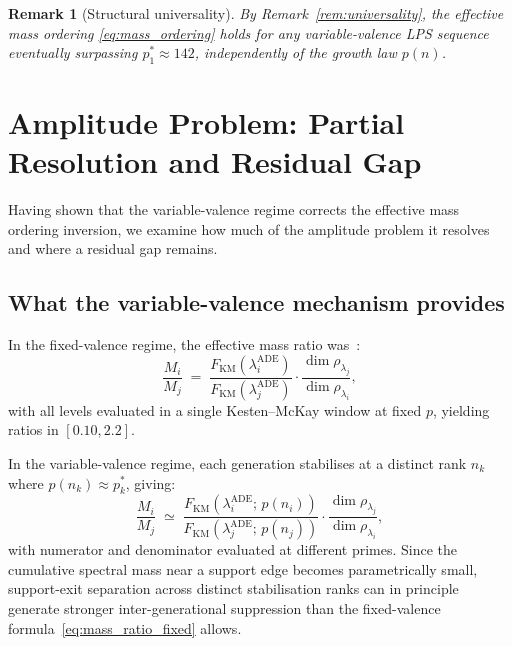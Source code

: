 \documentclass[11pt]{article}
\newtheorem{remark}[theorem]{Remark}
\newcommand{\lADE}[1]{\lambda_{#1}^{\mathrm{ADE}}}
\newcommand{\FKM}{F_{\mathrm{KM}}}
\begin{document}
    \begin{remark}[Structural universality]
      \label{rem:universality_mass}
      By Remark~\ref{rem:universality}, the effective mass ordering
      \eqref{eq:mass_ordering} holds for any variable-valence LPS sequence
      eventually surpassing $p_1^* \approx 142$, independently of the growth
      law $p(n)$.
    \end{remark}

  \section{Amplitude Problem: Partial Resolution and Residual Gap}
  \label{sec:amplitude}


  Having shown that the variable-valence regime corrects the effective mass
  ordering inversion, we examine how much of the amplitude problem it resolves
  and where a residual gap remains.

  \subsection{What the variable-valence mechanism provides}
    \label{subsec:what_is_gained}

    In the fixed-valence regime, the effective mass ratio was~\cite{Beau2026a5}:
    \begin{equation}
      \frac{M_i}{M_j} \;=\;
      \frac{\FKM(\lADE{i})}{\FKM(\lADE{j})}
      \cdot \frac{\dim \rho_{\lambda_j}}{\dim \rho_{\lambda_i}},
      \label{eq:mass_ratio_fixed}
    \end{equation}
    with all levels evaluated in a single Kesten--McKay window at fixed $p$,
    yielding ratios in $[0.10, 2.2]$.

    In the variable-valence regime, each generation stabilises at a distinct
    rank $n_k$ where $p(n_k) \approx p_k^*$, giving:
    \begin{equation}
      \frac{M_i}{M_j} \;\simeq\;
      \frac{\FKM(\lADE{i};\,p(n_i))}{\FKM(\lADE{j};\,p(n_j))}
      \cdot \frac{\dim \rho_{\lambda_j}}{\dim \rho_{\lambda_i}},
      \label{eq:mass_ratio_variable}
    \end{equation}
    with numerator and denominator evaluated at different primes.
    Since the cumulative spectral mass near a support edge becomes parametrically
    small, support-exit separation across distinct stabilisation ranks can in
    principle generate stronger inter-generational suppression than the
    fixed-valence formula~\eqref{eq:mass_ratio_fixed} allows.
\end{document}
